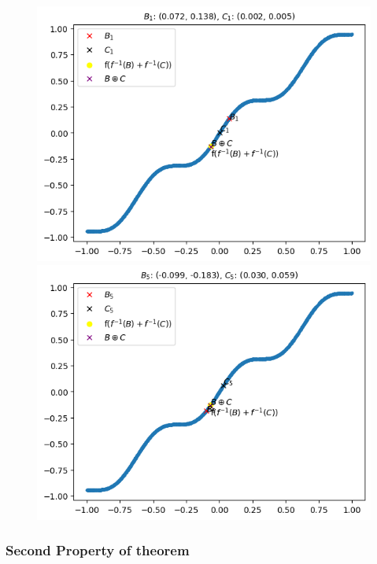 \documentclass{article}
\begin{document}
            \begin{figure}[h]
                \centering
                \begin{minipage}{0.5\textwidth}
                    \centering
                    \includegraphics[width=0.9\linewidth]{./images/3.png}
                \end{minipage}%
                \begin{minipage}{0.5\textwidth}
                    \centering
                    \includegraphics[width=0.9\linewidth]{./images/4.png}
                \end{minipage}
            \end{figure}
            \newpage
    \subsubsection{Second Property of theorem}
\end{document}
